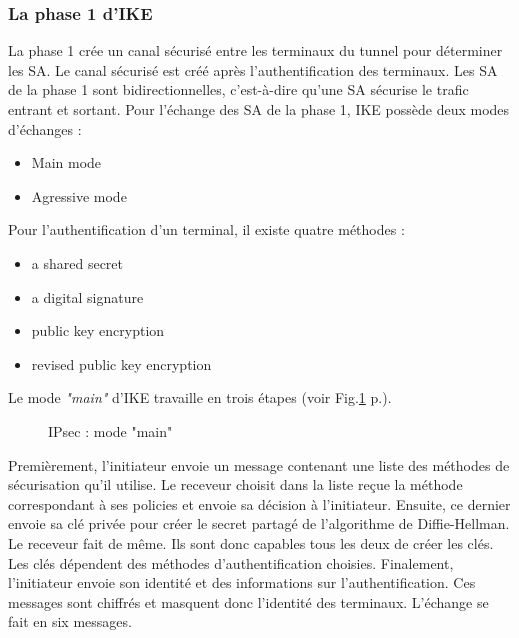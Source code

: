 \subsubsection{La phase 1 d'IKE}
La phase 1 crée un canal sécurisé entre les terminaux du tunnel pour déterminer les SA. Le canal sécurisé est créé après l'authentification des terminaux. Les SA de la phase 1 sont bidirectionnelles, c'est-à-dire qu'une SA sécurise le trafic entrant et sortant. 
Pour l'échange des SA de la phase 1, IKE possède deux modes d'échanges : 
\begin{itemize}
	\item Main mode
	\item Agressive mode
\end{itemize}
Pour l'authentification d'un terminal, il existe quatre méthodes : 
\begin{itemize}
	\item a shared secret 
	\item a digital signature
	\item public key encryption
	\item revised public key encryption
\end{itemize}
Le mode \textit{"main"} d'IKE travaille en trois étapes (voir Fig.\ref{fig:ipsmain} p.\pageref{fig:ipsmain}). 
\begin{figure}[ht]
\centering
{}
\caption{IPsec : mode "main"}
\label{fig:ipsmain}
\end{figure}
Premièrement, l'initiateur envoie un message contenant une liste des méthodes de sécurisation qu'il utilise. 
Le receveur choisit dans la liste reçue la méthode correspondant à ses policies et envoie sa décision à l'initiateur. 
Ensuite, ce dernier envoie sa clé privée pour créer le secret partagé de l'algorithme de Diffie-Hellman. 
Le receveur fait de même. Ils sont donc capables tous les deux de créer les clés. 
Les clés dépendent des méthodes d'authentification choisies. 
Finalement, l'initiateur envoie son identité et des informations sur l'authentification. 
Ces messages sont chiffrés et masquent donc l'identité des terminaux. 
L'échange se fait en six messages.

